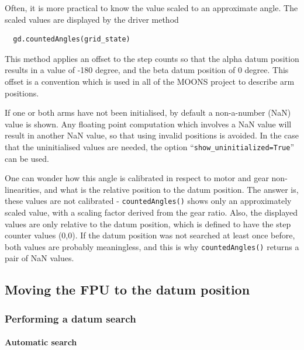 \documentclass[11pt,a4paper]{report}
\begin{document}
Often, it is more practical to know the value scaled to an approximate
angle. The scaled values are displayed by the driver method
\begin{verbatim}
  gd.countedAngles(grid_state)
\end{verbatim}
This method applies an offset to the step counts so that the alpha
datum position results in a value of -180 degree, and the beta datum
position of 0 degree. This offset is a convention which is used in all
of the MOONS project to describe arm positions.


If one or both arms have not been initialised, by default a
non-a-number (NaN) value is shown. Any floating point computation
which involves a NaN value will result in another NaN value, so that
using invalid positions is avoided.  In the case that the
uninitialised values are needed, the option
``\texttt{show\_uninitialized=True}'' can be used.


One can wonder how this angle is calibrated in respect to motor and
gear non-linearities, and what is the relative position to the datum
position. The answer is, these values are not calibrated -
\texttt{countedAngles()} shows only an approximately scaled value,
with a scaling factor derived from the gear ratio.  Also, the
displayed values are only relative to the datum position, which is
defined to have the step counter values (0,0). If the datum position
was not searched at least once before, both values are probably
meaningless, and this is why \texttt{countedAngles()} returns a pair
of NaN values.




\subsection{Moving the FPU to the datum position}
\label{sec:finddatumreference}
\subsubsection{Performing a datum search}

\paragraph{Automatic search}
\end{document}
